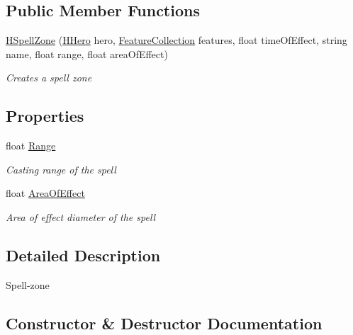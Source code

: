 \subsection*{Public Member Functions}
\begin{DoxyCompactItemize}
\item 
\hyperlink{class_hel_project_1_1_game_world_1_1_spells_1_1_h_spell_zone_a50d483de52dff05af4fa7b4ca32e641c}{H\+Spell\+Zone} (\hyperlink{class_hel_project_1_1_game_world_1_1_entities_1_1_h_hero}{H\+Hero} hero, \hyperlink{class_hel_project_1_1_features_1_1_feature_collection}{Feature\+Collection} features, float time\+Of\+Effect, string name, float range, float area\+Of\+Effect)
\begin{DoxyCompactList}\small\item\em Creates a spell zone \end{DoxyCompactList}\end{DoxyCompactItemize}
\subsection*{Properties}
\begin{DoxyCompactItemize}
\item 
float \hyperlink{class_hel_project_1_1_game_world_1_1_spells_1_1_h_spell_zone_ad3b44aced22248c0aaf4b63e5c62e491}{Range}
\begin{DoxyCompactList}\small\item\em Casting range of the spell \end{DoxyCompactList}\item 
float \hyperlink{class_hel_project_1_1_game_world_1_1_spells_1_1_h_spell_zone_aa5d5de1c0e032de623b3a9a471f95f3a}{Area\+Of\+Effect}
\begin{DoxyCompactList}\small\item\em Area of effect diameter of the spell \end{DoxyCompactList}\end{DoxyCompactItemize}


\subsection{Detailed Description}
Spell-\/zone 



\subsection{Constructor \& Destructor Documentation}
\hypertarget{class_hel_project_1_1_game_world_1_1_spells_1_1_h_spell_zone_a50d483de52dff05af4fa7b4ca32e641c}{}
